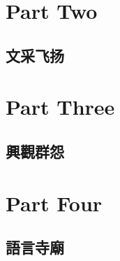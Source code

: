 \documentclass[11pt,fleqn]{book} %
\begin{document}









\part{Part Two}



\chapter{ 文采飞扬}






\part{Part Three}




\chapter{ 興觀群怨}













\part{Part Four}
\chapter{ 語言寺廟}
























\end{document}
